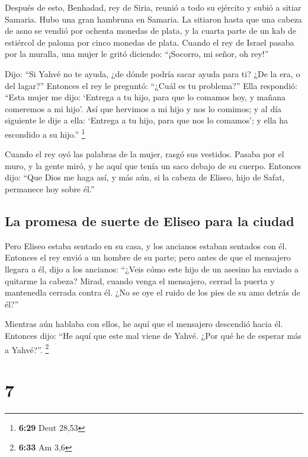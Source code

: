  Después de esto, Benhadad, rey de Siria, reunió a todo
su ejército y subió a sitiar Samaria.  Hubo una gran
hambruna en Samaria. La sitiaron hasta que una cabeza de asno se vendió
por ochenta monedas de plata, y la cuarta parte de un kab de estiércol
de paloma por cinco monedas de plata.  Cuando el rey de
Israel pasaba por la muralla, una mujer le gritó diciendo: ``¡Socorro,
mi señor, oh rey!''

 Dijo: ``Si Yahvé no te ayuda, ¿de dónde podría sacar
ayuda para ti? ¿De la era, o del lagar?''  Entonces el
rey le preguntó: ``¿Cuál es tu problema?'' Ella respondió: ``Esta mujer
me dijo: `Entrega a tu hijo, para que lo comamos hoy, y mañana comeremos
a mi hijo'.  Así que hervimos a mi hijo y nos lo comimos;
y al día siguiente le dije a ella: `Entrega a tu hijo, para que nos lo
comamos'; y ella ha escondido a su hijo.'' \footnote{\textbf{6:29} Deut
  28,53}

 Cuando el rey oyó las palabras de la mujer, rasgó sus
vestidos. Pasaba por el muro, y la gente miró, y he aquí que tenía un
saco debajo de su cuerpo.  Entonces dijo: ``Que Dios me
haga así, y más aún, si la cabeza de Eliseo, hijo de Safat, permanece
hoy sobre él.''

\hypertarget{la-promesa-de-suerte-de-eliseo-para-la-ciudad}{%
\subsection{La promesa de suerte de Eliseo para la
ciudad}\label{la-promesa-de-suerte-de-eliseo-para-la-ciudad}}

 Pero Eliseo estaba sentado en su casa, y los ancianos
estaban sentados con él. Entonces el rey envió a un hombre de su parte;
pero antes de que el mensajero llegara a él, dijo a los ancianos:
``¿Veis cómo este hijo de un asesino ha enviado a quitarme la cabeza?
Mirad, cuando venga el mensajero, cerrad la puerta y mantenedla cerrada
contra él. ¿No se oye el ruido de los pies de su amo detrás de él?''

 Mientras aún hablaba con ellos, he aquí que el mensajero
descendió hacia él. Entonces dijo: ``He aquí que este mal viene de
Yahvé. ¿Por qué he de esperar más a Yahvé?''. \footnote{\textbf{6:33} Am
  3,6}

\hypertarget{section-6}{%
\section{7}\label{section-6}}

